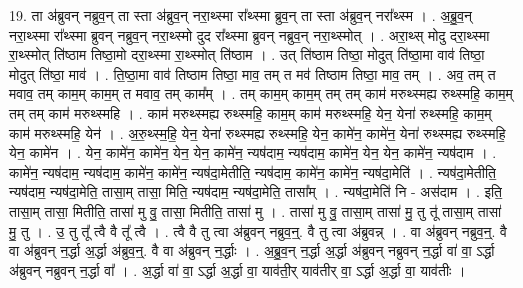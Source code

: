 \documentclass[17pt]{extarticle}
\begin{document}
19. ता अ॑ब्रुवन् नब्रुव॒न् ता स्ता अ॑ब्रुव॒न् नरा॒थ्स्मा रा᳚थ्स्मा ब्रुव॒न् ता स्ता अ॑ब्रुव॒न् नरा᳚थ्स्म । . अ॒ब्रु॒व॒न् नरा॒थ्स्मा रा᳚थ्स्मा ब्रुवन् नब्रुव॒न् नरा॒थ्स्मो दुद रा᳚थ्स्मा ब्रुवन् नब्रुव॒न् नरा॒थ्स्मोत् । . अरा॒थ्स् मोदु दरा॒थ्स्मा रा॒थ्स्मोत् ति॑ष्ठाम तिष्ठा॒मो दरा॒थ्स्मा रा॒थ्स्मोत् ति॑ष्ठाम । . उत् ति॑ष्ठाम तिष्ठा॒ मोदुत् ति॑ष्ठा॒मा वाव॑ तिष्ठा॒ मोदुत् ति॑ष्ठा॒ माव॑ । . ति॒ष्ठा॒मा वाव॑ तिष्ठाम तिष्ठा॒ माव॒ तम् त मव॑ तिष्ठाम तिष्ठा॒ माव॒ तम् । . अव॒ तम् त मवाव॒ तम् काम॒म् काम॒म् त मवाव॒ तम् काम᳚म् । . तम् काम॒म् काम॒म् तम् तम् काम॑ मरुथ्स्मह्य रुथ्स्महि॒ काम॒म् तम् तम् काम॑ मरुथ्स्महि । . काम॑ मरुथ्स्मह्य रुथ्स्महि॒ काम॒म् काम॑ मरुथ्स्महि॒ येन॒ येना॑ रुथ्स्महि॒ काम॒म् काम॑ मरुथ्स्महि॒ येन॑ । . अ॒रु॒थ्स्म॒हि॒ येन॒ येना॑ रुथ्स्मह्य रुथ्स्महि॒ येन॒ कामे॑न॒ कामे॑न॒ येना॑ रुथ्स्मह्य रुथ्स्महि॒ येन॒ कामे॑न । . येन॒ कामे॑न॒ कामे॑न॒ येन॒ येन॒ कामे॑न॒ न्यष॑दाम॒ न्यष॑दाम॒ कामे॑न॒ येन॒ येन॒ कामे॑न॒ न्यष॑दाम । . कामे॑न॒ न्यष॑दाम॒ न्यष॑दाम॒ कामे॑न॒ कामे॑न॒ न्यष॑दा॒मेतीति॒ न्यष॑दाम॒ कामे॑न॒ कामे॑न॒ न्यष॑दा॒मेति॑ । . न्यष॑दा॒मेतीति॒ न्यष॑दाम॒ न्यष॑दा॒मेति॒ तासा॒म् तासा॒ मिति॒ न्यष॑दाम॒ न्यष॑दा॒मेति॒ तासा᳚म् । . न्यष॑दा॒मेति॑ नि - अस॑दाम । . इति॒ तासा॒म् तासा॒ मितीति॒ तासा॑ मु वु॒ तासा॒ मितीति॒ तासा॑ मु । . तासा॑ मु वु॒ तासा॒म् तासा॑ मु॒ तु तू॑ तासा॒म् तासा॑ मु॒ तु । . उ॒ तु तू᳚ त्वै वै तू᳚ त्वै । . त्वै वै तु त्वा अ॑ब्रुवन् नब्रुव॒न्॒. वै तु त्वा अ॑ब्रुवन्न् । . वा अ॑ब्रुवन् नब्रुव॒न्॒. वै वा अ॑ब्रुवन् न॒र्द्धा अ॒र्द्धा अ॑ब्रुव॒न्॒. वै वा अ॑ब्रुवन् न॒र्द्धाः । . अ॒ब्रु॒व॒न् न॒र्द्धा अ॒र्द्धा अ॑ब्रुवन् नब्रुवन् न॒र्द्धा वा॑ वा॒ ऽर्द्धा अ॑ब्रुवन् नब्रुवन् न॒र्द्धा वा᳚ । . अ॒र्द्धा वा॑ वा॒ ऽर्द्धा अ॒र्द्धा वा॒ याव॑ती॒र् याव॑तीर् वा॒ ऽर्द्धा अ॒र्द्धा वा॒ याव॑तीः । \newline
\end{document}
